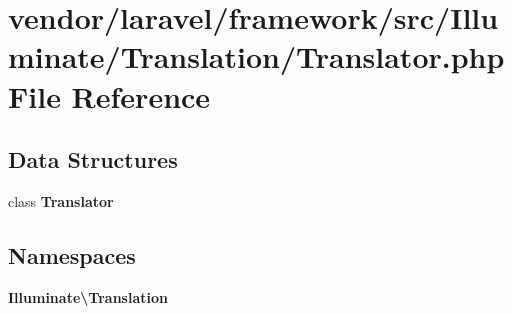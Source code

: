 \section{vendor/laravel/framework/src/\+Illuminate/\+Translation/\+Translator.php File Reference}
\label{laravel_2framework_2src_2_illuminate_2_translation_2_translator_8php}
\subsection*{Data Structures}
\begin{DoxyCompactItemize}
\item 
class {\bf Translator}
\end{DoxyCompactItemize}
\subsection*{Namespaces}
\begin{DoxyCompactItemize}
\item 
 {\bf Illuminate\textbackslash{}\+Translation}
\end{DoxyCompactItemize}
